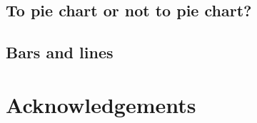 \subsection{To pie chart or not to pie chart?}

\subsection{Bars and lines}


\section{}

\section{Acknowledgements}
%



